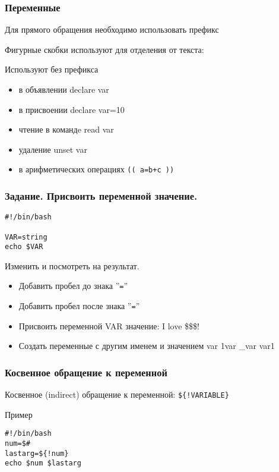 

\begin{frame}
	\frametitle{Переменные}
	\large{}

	Для прямого обращения необходимо использовать префикс \\
	\center{\Large{\tt \$}}

	Фигурные скобки используют для отделения от текста:\\

	
	\begin{alertblock}{Используют без префикса}
		\begin{itemize}
			\item в объявлении declare var
			\item в присвоении declare var=10
			\item чтение в командe read var
			\item удаление unset var
			\item в арифметических операциях {\tt (( a=b+c ))}
		\end{itemize}
	\end{alertblock}
\end{frame}

\begin{frame}[fragile]
	\frametitle{Задание. Присвоить переменной значение.}

	\begin{lstlisting}
#!/bin/bash

VAR=string
echo $VAR
	\end{lstlisting}


	\begin{block}{Изменить и посмотреть на результат.}
		\begin{itemize}
			\item Добавить пробел до знака ''{\tt =}''
			\item Добавить пробел после знака ''{\tt =}''
			\item Присвоить переменной VAR значение: I love \$\$\$!
			\item Создать переменные с другим именем и значением var 1var \_var var1
		\end{itemize}
	\end{block}

\end{frame}

\begin{frame}[fragile]
	\frametitle{Косвенное обращение к переменной}

	Косвенное (indirect) обращение к переменной: {\tt \$\{!VARIABLE\}}

	\begin{block}{Пример}
		\begin{lstlisting}
#!/bin/bash 
num=$# 
lastarg=${!num} 
echo $num $lastarg
		\end{lstlisting}
	\end{block}

\end{frame}


